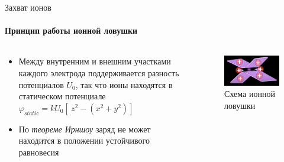 \documentclass{beamer}
\begin{document}
    \begin{frame}{Захват ионов}
    \framesubtitle{Принцип работы ионной ловушки}

        \begin{columns}

        \begin{column}{0.6\textwidth}

            \begin{itemize}
                \item Между внутренним и внешним участками каждого электрода поддерживается
                разность потенциалов $U_{0}$, так что ионы находятся в статическом потенциале
                $\varphi_{static} = k U_{0} [\ z^2 - (x^2 + y^2) ]\ $
                \item По \textit{теореме Ирншоу} заряд не может находится в положении устойчивого равновесия
            \end{itemize}

        \end{column}

        \begin{column}{0.5\textwidth}
            \begin{figure}
                \centering
                \includegraphics[width=\textwidth]{media/ion-trap.png}
                \caption{Схема ионной ловушки}
            \end{figure}
        \end{column}

        \end{columns}

    \end{frame}
	
\end{document}
